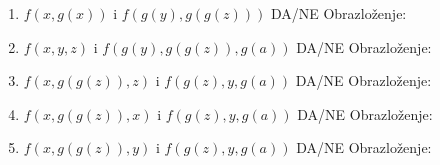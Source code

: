 \documentclass[a4paper]{article}
\begin{document}
\begin{enumerate}
\item $f(x,g(x))$ i $f(g(y),g(g(z)))$ \hspace*{1mm} DA/NE \hspace*{3mm}  Obrazloženje: \vspace*{10mm} \\

\item $f(x,y,z)$ i $f(g(y),g(g(z)),g(a))$ \hspace*{1mm} DA/NE \hspace*{3mm}  Obrazloženje: \vspace*{10mm} \\

\item $f(x,g(g(z)),z)$ i $f(g(z),y,g(a))$ \hspace*{1mm} DA/NE \hspace*{3mm}  Obrazloženje: \vspace*{10mm} \\

\item $f(x,g(g(z)),x)$ i $f(g(z),y,g(a))$ \hspace*{1mm} DA/NE \hspace*{3mm}  Obrazloženje: \vspace*{10mm} \\

\item $f(x,g(g(z)),y)$ i $f(g(z),y,g(a))$ \hspace*{1mm} DA/NE \hspace*{3mm}  Obrazloženje: \vspace*{10mm} \\


\end{enumerate}
\end{document}
